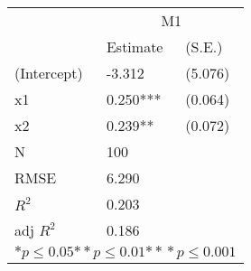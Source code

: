 \begin{tabular}{*{3}{l}}
\hline
                  & \multicolumn{2}{c}{M1}   \tabularnewline
                   &Estimate  &(S.E.)  \tabularnewline
 \hline
 \hline
   (Intercept)     &-3.312   &   (5.076) \tabularnewline
   x1              &0.250***   &   (0.064) \tabularnewline
   x2              &0.239**   &   (0.072) \tabularnewline
 \hline
 N                 &100       &        \tabularnewline
 RMSE             &6.290         & \tabularnewline
 $R^2$             &0.203         & \tabularnewline
 adj $R^2$         &0.186         & \tabularnewline
 \hline
\hline
 
 \multicolumn{3}{c}{${*  p}\le 0.05$${*\!\!*  p}\le 0.01$${*\!\!*\!\!*  p}\le 0.001$}\tabularnewline
 \end{tabular}
